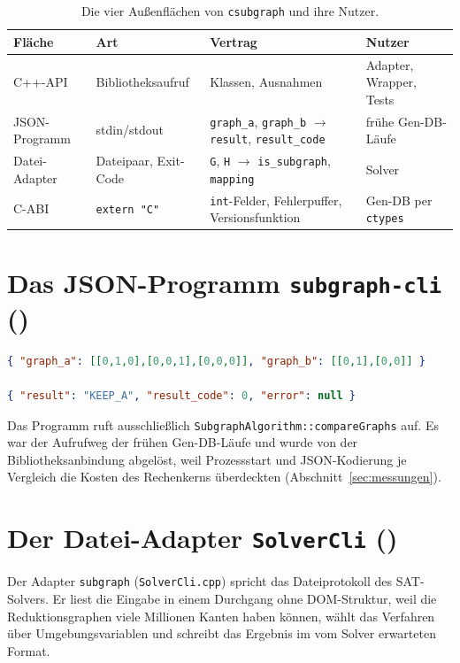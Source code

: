 \begin{table}[!ht]
	\centering
	\small
	\begin{tabularx}{\textwidth}{@{}L{2.6cm}L{3.0cm}YL{3.6cm}@{}}
		\toprule
		Fläche & Art & Vertrag & Nutzer \\
		\midrule
		C++-API & Bibliotheksaufruf & Klassen, Ausnahmen & Adapter, Wrapper, Tests \\
		JSON-Programm & stdin/stdout & \texttt{graph\_a}, \texttt{graph\_b} $\to$ \texttt{result}, \texttt{result\_code} & frühe Gen-DB-Läufe \\
		Datei-Adapter & Dateipaar, Exit-Code & \texttt{G}, \texttt{H} $\to$ \texttt{is\_subgraph}, \texttt{mapping} & Solver \\
		C-ABI & \texttt{extern "C"} & \texttt{int}-Felder, Fehlerpuffer, Versionsfunktion & Gen-DB per \texttt{ctypes} \\
		\bottomrule
	\end{tabularx}
	\caption{Die vier Außenflächen von \texttt{csubgraph} und ihre Nutzer.}
	\label{tab:aussen}
\end{table}

\section{Das JSON-Programm \texttt{subgraph-cli} ()}

\begin{lstlisting}[language=JSON, caption={Protokoll von \texttt{subgraph-cli}: Eingabe und Ausgabe}, label={lst:cli_json}]
{ "graph_a": [[0,1,0],[0,0,1],[0,0,0]], "graph_b": [[0,1],[0,0]] }

{ "result": "KEEP_A", "result_code": 0, "error": null }
\end{lstlisting}

Das Programm ruft ausschließlich \texttt{SubgraphAlgorithm::compareGraphs} auf. Es war der Aufrufweg der frühen Gen-DB-Läufe und wurde von der Bibliotheksanbindung abgelöst, weil Prozessstart und JSON-Kodierung je Vergleich die Kosten des Rechenkerns überdeckten (Abschnitt~\ref{sec:messungen}).

\section{Der Datei-Adapter \texttt{SolverCli} ()}
\label{sec:adapter}

Der Adapter \texttt{subgraph} (\texttt{SolverCli.cpp}) spricht das Dateiprotokoll des SAT-Solvers. Er liest die Eingabe in einem Durchgang ohne DOM-Struktur, weil die Reduktionsgraphen viele Millionen Kanten haben können, wählt das Verfahren über Umgebungsvariablen und schreibt das Ergebnis im vom Solver erwarteten Format.

